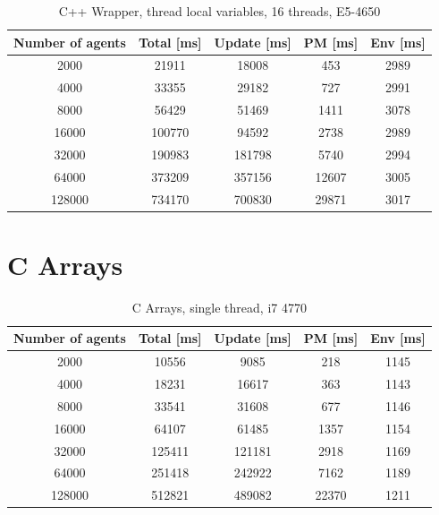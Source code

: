 \documentclass[12pt, a4paper]{report}
\begin{document}
\begin{appendices}
\begin{table}[H]
  \begin{center}
    \begin{tabular}{|c||c||c|c|c|}
    \hline
    Number of agents & Total [ms] & Update [ms] & PM [ms] & Env [ms] \\ \hline
    2000             & 21911      & 18008       & 453     & 2989     \\
    4000             & 33355      & 29182       & 727     & 2991     \\
    8000             & 56429      & 51469       & 1411    & 3078     \\
    16000            & 100770     & 94592       & 2738    & 2989     \\
    32000            & 190983     & 181798      & 5740    & 2994     \\
    64000            & 373209     & 357156      & 12607   & 3005     \\
    128000           & 734170     & 700830      & 29871   & 3017     \\ \hline
    \end{tabular}
    \caption {C++ Wrapper, thread local variables, 16 threads, E5-4650}
    \label{table:append-c++-wrap-16-thread-potoo}
  \end{center}
\end{table}

\section{C Arrays}\label{appen-sec:bench-array}
\begin{table}[H]
  \begin{center}
    \begin{tabular}{|c||c||c|c|c|}
    \hline
    Number of agents & Total [ms] & Update [ms] & PM [ms] & Env [ms] \\ \hline
    2000             & 10556      & 9085        & 218     & 1145     \\
    4000             & 18231      & 16617       & 363     & 1143     \\
    8000             & 33541      & 31608       & 677     & 1146     \\
    16000            & 64107      & 61485       & 1357    & 1154     \\
    32000            & 125411     & 121181      & 2918    & 1169     \\
    64000            & 251418     & 242922      & 7162    & 1189     \\
    128000           & 512821     & 489082      & 22370   & 1211     \\ \hline
    \end{tabular}
    \caption {C Arrays, single thread, i7 4770}
    \label{table:append-c-arrays}
  \end{center}
\end{table}


\end{appendices}
\end{document}
